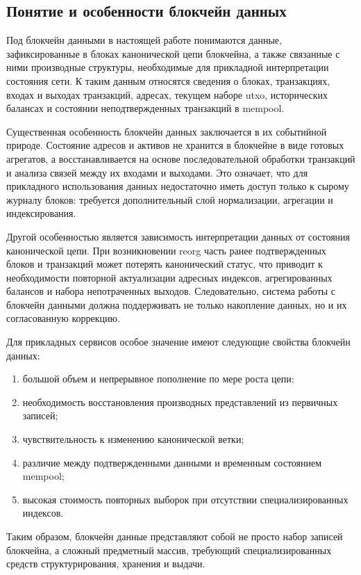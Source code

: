 ﻿\subsection{Понятие и особенности блокчейн данных}

Под блокчейн данными в настоящей работе понимаются данные, зафиксированные в
блоках канонической цепи блокчейна, а также связанные с ними производные
структуры, необходимые для прикладной интерпретации состояния сети. К таким
данным относятся сведения о блоках, транзакциях, входах и выходах транзакций,
адресах, текущем наборе \gls{utxo}, исторических балансах и состоянии
неподтвержденных транзакций в mempool.

Существенная особенность блокчейн данных заключается в их событийной природе.
Состояние адресов и активов не хранится в блокчейне в виде готовых агрегатов,
а восстанавливается на основе последовательной обработки транзакций и анализа
связей между их входами и выходами. Это означает, что для прикладного
использования данных недостаточно иметь доступ только к сырому журналу блоков:
требуется дополнительный слой нормализации, агрегации и индексирования.

Другой особенностью является зависимость интерпретации данных от состояния
канонической цепи. При возникновении reorg часть ранее подтвержденных блоков и
транзакций может потерять канонический статус, что приводит к необходимости
повторной актуализации адресных индексов, агрегированных балансов и набора
непотраченных выходов. Следовательно, система работы с блокчейн данными должна
поддерживать не только накопление данных, но и их согласованную коррекцию.

Для прикладных сервисов особое значение имеют следующие свойства
блокчейн данных:
\begin{enumerate}
    \item большой объем и непрерывное пополнение по мере роста цепи;
    \item необходимость восстановления производных представлений из первичных записей;
    \item чувствительность к изменению канонической ветки;
    \item различие между подтвержденными данными и временным состоянием mempool;
    \item высокая стоимость повторных выборок при отсутствии специализированных индексов.
\end{enumerate}

Таким образом, блокчейн данные представляют собой не просто набор записей
блокчейна, а сложный предметный массив, требующий специализированных средств
структурирования, хранения и выдачи.
